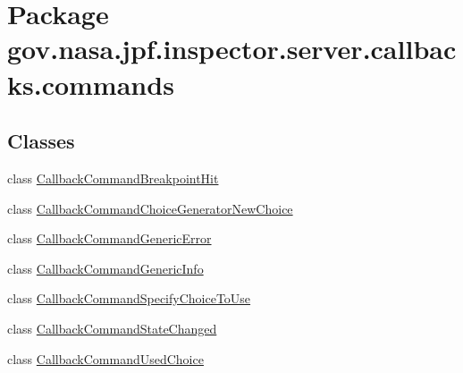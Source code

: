 \hypertarget{namespacegov_1_1nasa_1_1jpf_1_1inspector_1_1server_1_1callbacks_1_1commands}{}\section{Package gov.\+nasa.\+jpf.\+inspector.\+server.\+callbacks.\+commands}
\label{namespacegov_1_1nasa_1_1jpf_1_1inspector_1_1server_1_1callbacks_1_1commands}
\subsection*{Classes}
\begin{DoxyCompactItemize}
\item 
class \hyperlink{classgov_1_1nasa_1_1jpf_1_1inspector_1_1server_1_1callbacks_1_1commands_1_1_callback_command_breakpoint_hit}{Callback\+Command\+Breakpoint\+Hit}
\item 
class \hyperlink{classgov_1_1nasa_1_1jpf_1_1inspector_1_1server_1_1callbacks_1_1commands_1_1_callback_command_choice_generator_new_choice}{Callback\+Command\+Choice\+Generator\+New\+Choice}
\item 
class \hyperlink{classgov_1_1nasa_1_1jpf_1_1inspector_1_1server_1_1callbacks_1_1commands_1_1_callback_command_generic_error}{Callback\+Command\+Generic\+Error}
\item 
class \hyperlink{classgov_1_1nasa_1_1jpf_1_1inspector_1_1server_1_1callbacks_1_1commands_1_1_callback_command_generic_info}{Callback\+Command\+Generic\+Info}
\item 
class \hyperlink{classgov_1_1nasa_1_1jpf_1_1inspector_1_1server_1_1callbacks_1_1commands_1_1_callback_command_specify_choice_to_use}{Callback\+Command\+Specify\+Choice\+To\+Use}
\item 
class \hyperlink{classgov_1_1nasa_1_1jpf_1_1inspector_1_1server_1_1callbacks_1_1commands_1_1_callback_command_state_changed}{Callback\+Command\+State\+Changed}
\item 
class \hyperlink{classgov_1_1nasa_1_1jpf_1_1inspector_1_1server_1_1callbacks_1_1commands_1_1_callback_command_used_choice}{Callback\+Command\+Used\+Choice}
\end{DoxyCompactItemize}

